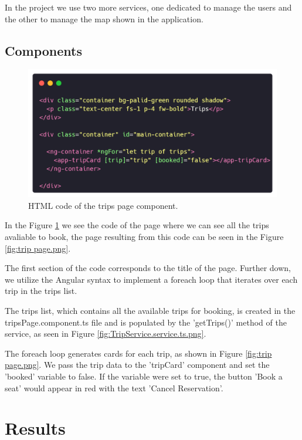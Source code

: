 \documentclass{article}
\begin{document}
    In the project we use two more services, one dedicated to manage the users and the other to manage the map shown in the application.

    \subsection*{Components}
    
    \begin{figure}[h]
      \centering
      \includegraphics[width=1\columnwidth]{figures/tripsPage.component.html.png}
      \caption{HTML code of the trips page component.\label{fig:tripsPage.component.html.png}}
      \end{figure}

      In the Figure \ref{fig:tripsPage.component.html.png} we see the code of the page where we can see all the trips avaliable to book, the page resulting from this code can be seen in the Figure \ref{fig:trip page.png}. 

      The first section of the code corresponds to the title of the page. Further down, we utilize the Angular syntax to implement a foreach loop that iterates over each trip in the trips list.

      The trips list, which contains all the available trips for booking, is created in the tripsPage.component.ts file and is populated by the 'getTrips()' method of the service, as seen in Figure \ref{fig:TripService.service.ts.png}. 

      The foreach loop generates cards for each trip, as shown in Figure \ref{fig:trip page.png}. We pass the trip data to the 'tripCard' component and set the 'booked' variable to false. If the variable were set to true, the button 'Book a seat' would appear in red with the text 'Cancel Reservation'.

    

  \section{Results}\label{sec:results}
    
\end{document}
